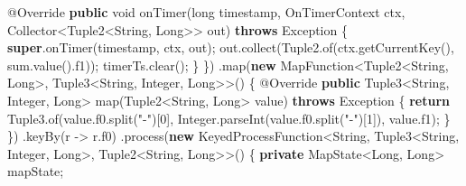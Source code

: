 \documentclass[cn,11pt,chinese]{elegantbook}
\newenvironment{Shaded}{}{}
\newcommand{\AttributeTok}[1]{\textcolor[rgb]{0.49,0.56,0.16}{#1}}
\newcommand{\BuiltInTok}[1]{#1}
\newcommand{\DataTypeTok}[1]{\textcolor[rgb]{0.56,0.13,0.00}{#1}}
\newcommand{\DecValTok}[1]{\textcolor[rgb]{0.25,0.63,0.44}{#1}}
\newcommand{\FunctionTok}[1]{\textcolor[rgb]{0.02,0.16,0.49}{#1}}
\newcommand{\KeywordTok}[1]{\textcolor[rgb]{0.00,0.44,0.13}{\textbf{#1}}}
\newcommand{\NormalTok}[1]{#1}
\newcommand{\StringTok}[1]{\textcolor[rgb]{0.25,0.44,0.63}{#1}}
\begin{document}
\begin{Shaded}
\begin{Highlighting}[]
                \AttributeTok{@Override}
                \KeywordTok{public} \DataTypeTok{void} \FunctionTok{onTimer}\NormalTok{(}\DataTypeTok{long}\NormalTok{ timestamp, OnTimerContext ctx, Collector\textless{}Tuple2\textless{}}\BuiltInTok{String}\NormalTok{, }\BuiltInTok{Long}\NormalTok{\textgreater{}\textgreater{} out) }\KeywordTok{throws} \BuiltInTok{Exception}\NormalTok{ \{}
                    \KeywordTok{super}\NormalTok{.}\FunctionTok{onTimer}\NormalTok{(timestamp, ctx, out);}
\NormalTok{                    out.}\FunctionTok{collect}\NormalTok{(Tuple2.}\FunctionTok{of}\NormalTok{(ctx.}\FunctionTok{getCurrentKey}\NormalTok{(), sum.}\FunctionTok{value}\NormalTok{().}\FunctionTok{f1}\NormalTok{));}
\NormalTok{                    timerTs.}\FunctionTok{clear}\NormalTok{();}
\NormalTok{                \}}
\NormalTok{            \})}
\NormalTok{            .}\FunctionTok{map}\NormalTok{(}\KeywordTok{new}\NormalTok{ MapFunction\textless{}Tuple2\textless{}}\BuiltInTok{String}\NormalTok{, }\BuiltInTok{Long}\NormalTok{\textgreater{}, Tuple3\textless{}}\BuiltInTok{String}\NormalTok{, }\BuiltInTok{Integer}\NormalTok{, }\BuiltInTok{Long}\NormalTok{\textgreater{}\textgreater{}() \{}
                \AttributeTok{@Override}
                \KeywordTok{public}\NormalTok{ Tuple3\textless{}}\BuiltInTok{String}\NormalTok{, }\BuiltInTok{Integer}\NormalTok{, }\BuiltInTok{Long}\NormalTok{\textgreater{} }\FunctionTok{map}\NormalTok{(Tuple2\textless{}}\BuiltInTok{String}\NormalTok{, }\BuiltInTok{Long}\NormalTok{\textgreater{} value) }\KeywordTok{throws} \BuiltInTok{Exception}\NormalTok{ \{}
                    \KeywordTok{return}\NormalTok{ Tuple3.}\FunctionTok{of}\NormalTok{(value.}\FunctionTok{f0}\NormalTok{.}\FunctionTok{split}\NormalTok{(}\StringTok{"{-}"}\NormalTok{)[}\DecValTok{0}\NormalTok{], }\BuiltInTok{Integer}\NormalTok{.}\FunctionTok{parseInt}\NormalTok{(value.}\FunctionTok{f0}\NormalTok{.}\FunctionTok{split}\NormalTok{(}\StringTok{"{-}"}\NormalTok{)[}\DecValTok{1}\NormalTok{]), value.}\FunctionTok{f1}\NormalTok{);}
\NormalTok{                \}}
\NormalTok{            \})}
\NormalTok{            .}\FunctionTok{keyBy}\NormalTok{(r {-}\textgreater{} r.}\FunctionTok{f0}\NormalTok{)}
\NormalTok{            .}\FunctionTok{process}\NormalTok{(}\KeywordTok{new}\NormalTok{ KeyedProcessFunction\textless{}}\BuiltInTok{String}\NormalTok{, Tuple3\textless{}}\BuiltInTok{String}\NormalTok{, }\BuiltInTok{Integer}\NormalTok{, }\BuiltInTok{Long}\NormalTok{\textgreater{}, Tuple2\textless{}}\BuiltInTok{String}\NormalTok{, }\BuiltInTok{Long}\NormalTok{\textgreater{}\textgreater{}() \{}
                \KeywordTok{private}\NormalTok{ MapState\textless{}}\BuiltInTok{Long}\NormalTok{, }\BuiltInTok{Long}\NormalTok{\textgreater{} mapState;}


\end{Highlighting}
\end{Shaded}
\end{document}

